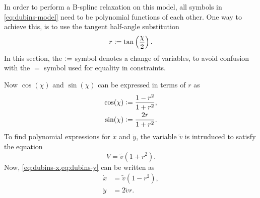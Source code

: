 In order to perform a B-spline relaxation on this model, all symbols in \cref{eq:dubins-model} need to be polynomial functions of each other. One way to  achieve this, is to use the tangent half-angle substitution
\begin{equation}\label{eq:tangent-half-angle}
    r \vcentcolon= \tan\left(\frac{\chi}{2}\right).
\end{equation}
In this section, the $\vcentcolon=$ symbol denotes a change of variables, to avoid confusion with the $=$ symbol used for equality in constraints. 

Now $\cos(\chi)$ and $\sin(\chi)$ can be expressed in terms of $r$ as
\begin{subequations}\label{eq:cos-sin-r}
    \begin{align}
        \cos(\chi) &\vcentcolon= \frac{1 - r^2}{1 + r^2}, \label{eq:cos-r} \\
        \sin(\chi) &\vcentcolon= \frac{2r}{1 + r^2}.      \label{eq:sin-r}
    \end{align}
\end{subequations}
To find polynomial expressions for $\dot x$ and $\dot y$, the variable $\tilde v$ is intruduced to satisfy the equation
\begin{equation}\label{eq:constraint-V}
    V = \tilde v (1 + r^2).
\end{equation}
Now, \cref{eq:dubins-x,eq:dubins-y} can be written as
\begin{subequations}\label{eq:dubins-xy}
    \begin{align}
        \dot x &= \tilde v (1 - r^2), \label{eq:dubins-x-r} \\
        \dot y &= 2\tilde v r.        \label{eq:dubins-y-r}
    \end{align}
\end{subequations}

